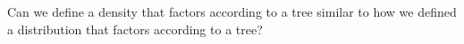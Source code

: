 

Can we define a density that factors according to a tree similar to how we defined a distribution that factors according to a tree?

